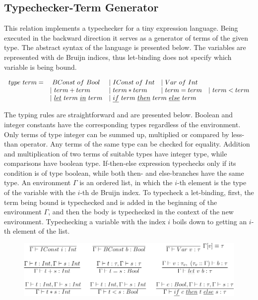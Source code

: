 \subsection{Typechecker-Term Generator}

This relation implements a typechecker for a tiny expression language.
Being executed in the backward direction it serves as a generator of terms of the given type.
The abstract syntax of the language is presented below.
The variables are represented with de Bruijn indices, thus let-binding does not specify which variable is being bound.

\[\begin{array}{lllll}
  type \ term = &\ BConst \ of \ Bool &| \ IConst \ of \ Int &| \ Var \ of \ Int & \\
  & | \ term + term &| \ term * term &| \ term = term &| \ term < term \\
  &| \ \underline{let} \ term \ \underline{in} \ term
  &\multicolumn{2}{l}{| \ \underline{if} \ term \ \underline{then} \ term \ \underline{else} \ term} &
\end{array}\]

The typing rules are straightforward and are presented below.
Boolean and integer constants have the corresponding types regardless of the environment.
Only terms of type integer can be summed up, multiplied or compared by less-than operator.
Any terms of the same type can be checked for equality.
Addition and multiplication of two terms of suitable types have integer type, while comparisons have boolean type.
If-then-else expression typechecks only if its condition is of type boolean, while both then- and else-branches have the same type.
An environment $\Gamma$ is an ordered list, in which the $i$-th element is the type of the variable with the $i$-th de Bruijn index.
To typecheck a let-binding, first, the term being bound is typechecked and is added in the beginning of the environment $\Gamma$, and then the body is typechecked in the context of the new environment.
Typechecking a variable with the index $i$ boils down to getting an $i$-th element of the list.

\vspace{-15pt}
\begin{figure}[!h]
  \centering
  \includegraphics[width=\textwidth]{figures/typechecker-crop.pdf}
\end{figure}
\vspace{-15pt}


